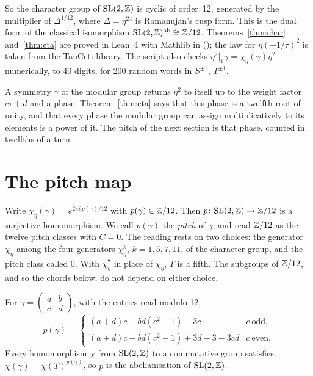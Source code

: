 \documentclass[11pt]{article}
\begin{document}
So the character group of $\mathrm{SL}(2,\mathbb{Z})$ is cyclic of order~12, generated by the multiplier of $\Delta^{1/12}$, where $\Delta = \eta^{24}$ is Ramanujan's cusp form.
This is the dual form of the classical isomorphism $\mathrm{SL}(2,\mathbb{Z})^{\mathrm{ab}}\cong\mathbb{Z}/12$.
Theorems~\ref{thm:char} and~\ref{thm:eta} are proved in Lean~4 with Mathlib in \formal{} (); the law for $\eta(-1/\tau)^2$ is taken from the TauCeti library.
The script  also checks $\eta^2|_1\gamma = \chi_\eta(\gamma)\eta^2$ numerically, to 40 digits, for 200 random words in $S^{\pm1}$, $T^{\pm1}$.

\physical
A symmetry $\gamma$ of the modular group returns $\eta^2$ to itself up to the weight factor $c\tau+d$ and a phase.
Theorem~\ref{thm:eta} says that this phase is a twelfth root of unity, and that every phase the modular group can assign multiplicatively to its elements is a power of it.
The pitch of the next section is that phase, counted in twelfths of a turn.

\section{The pitch map}

Write $\chi_\eta(\gamma) = e^{2\pi i\,p(\gamma)/12}$ with $p(\gamma)\in\mathbb{Z}/12$.
Then $p\colon\mathrm{SL}(2,\mathbb{Z})\to\mathbb{Z}/12$ is a surjective homomorphism.
We call $p(\gamma)$ the \emph{pitch} of $\gamma$, and read $\mathbb{Z}/12$ as the twelve pitch classes with $C = 0$.
The reading rests on two choices: the generator $\chi_\eta$ among the four generators $\chi_\eta^k$, $k = 1,5,7,11$, of the character group, and the pitch class called $0$. With $\chi_\eta^7$ in place of $\chi_\eta$, $T$ is a fifth. The subgroups of $\mathbb{Z}/12$, and so the chords below, do not depend on either choice.

\begin{proposition}\label{prop:pitch}
For $\gamma = \left(\begin{smallmatrix}a&b\\c&d\end{smallmatrix}\right)$, with the entries read modulo 12,
\[
  p(\gamma) = \begin{cases}(a+d)c-bd(c^2-1)-3c & c\ \text{odd},\\ (a+d)c-bd(c^2-1)+3d-3-3cd & c\ \text{even}.\end{cases}
\]
Every homomorphism $\chi$ from $\mathrm{SL}(2,\mathbb{Z})$ to a commutative group satisfies $\chi(\gamma) = \chi(T)^{p(\gamma)}$, so $p$ is the abelianisation of $\mathrm{SL}(2,\mathbb{Z})$.
\end{proposition}
\end{document}
